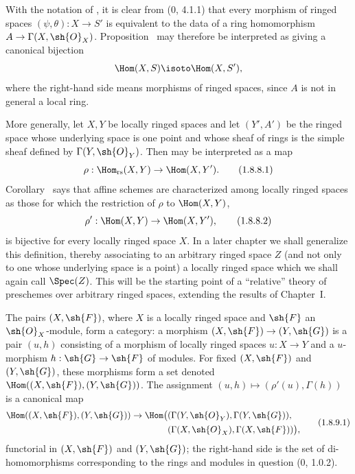 \begin{env}[1.8.8]
\label{ega2:addendum:I.1.8.8}
With the notation of , it is clear from (0, 4.1.1) that
every morphism of ringed spaces $(\psi,\theta):X\to S'$ is equivalent
to the data of a ring homomorphism
$A\to\Gamma(X,\sh{O}_X)$.  Proposition~ may therefore
be interpreted as giving a canonical bijection
\[
  \Hom(X,S)\isoto\Hom(X,S'),
\]
where the right-hand side means morphisms of ringed spaces, since $A$
is not in general a local ring.

More generally, let $X,Y$ be locally ringed spaces and let $(Y',A')$
be the ringed space whose underlying space is one point and whose
sheaf of rings is the simple sheaf defined by
$\Gamma(Y,\sh{O}_Y)$.  Then  may be interpreted as a
map
\begin{equation}
\label{ega2:addendum:I.1.8.8.1}
  \rho:\Hom_{\mathrm{rs}}(X,Y)\to\Hom(X,Y').
\tag{1.8.8.1}
\end{equation}
Corollary~ says that affine schemes are characterized
among locally ringed spaces as those for which the restriction of
$\rho$ to $\Hom(X,Y)$,
\begin{equation}
\label{ega2:addendum:I.1.8.8.2}
  \rho':\Hom(X,Y)\to\Hom(X,Y'),
\tag{1.8.8.2}
\end{equation}
is bijective for every locally ringed space $X$.  In a later chapter
we shall generalize this definition, thereby associating to an
arbitrary ringed space $Z$ (and not only to one whose underlying
space is a point) a locally ringed space which we shall again call
$\Spec(Z)$.  This will be the starting point of a ``relative'' theory
of preschemes over arbitrary ringed spaces, extending the results of
Chapter~I.
\end{env}

\begin{env}[1.8.9]
\label{ega2:addendum:I.1.8.9}
The pairs $(X,\sh{F})$, where $X$ is a locally ringed space and
$\sh{F}$ an $\sh{O}_X$-module, form a category: a morphism
$(X,\sh{F})\to(Y,\sh{G})$ is a pair $(u,h)$ consisting of a morphism
of
locally ringed spaces $u:X\to Y$ and a $u$-morphism
$h:\sh{G}\to\sh{F}$ of modules.  For
fixed $(X,\sh{F})$ and $(Y,\sh{G})$, these morphisms form a set denoted
$\Hom((X,\sh{F}),(Y,\sh{G}))$.  The assignment
$(u,h)\mapsto(\rho'(u),\Gamma(h))$ is a canonical map
\begin{equation}
\label{ega2:addendum:I.1.8.9.1}
\begin{split}
  \Hom((X,\sh{F}),(Y,\sh{G}))\to
  \Hom\bigl(
    &(\Gamma(Y,\sh{O}_Y),\Gamma(Y,\sh{G})),\\
    &(\Gamma(X,\sh{O}_X),\Gamma(X,\sh{F}))
  \bigr),
\end{split}
\tag{1.8.9.1}
\end{equation}
functorial in $(X,\sh{F})$ and $(Y,\sh{G})$; the right-hand side is
the set of di-homomorphisms corresponding to the rings and modules in
question (0, 1.0.2).
\end{env}

